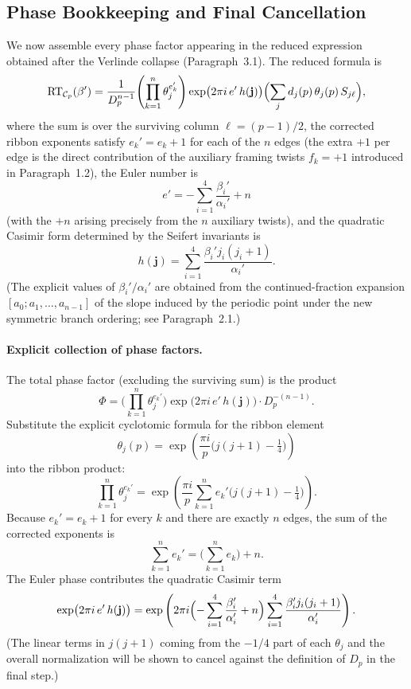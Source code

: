 \subsection{Phase Bookkeeping and Final Cancellation}
\label{subsec:phase-bookkeeping}

We now assemble every phase factor appearing in the reduced expression obtained after the Verlinde collapse (Paragraph~3.1). The reduced formula is
\[
\mathrm{RT}_{\mathcal{C}_p}(\beta') = \frac{1}{D_p^{n-1}} \Biggl( \prod_{k=1}^n \theta_j^{e_k'} \Biggr) \exp\bigl(2\pi i \, e' \, h(\mathbf{j})\bigr) \Bigl( \sum_j d_j(p) \, \theta_j(p) \, S_{j\ell} \Bigr),
\]
where the sum is over the surviving column \(\ell = (p-1)/2\), the corrected ribbon exponents satisfy \(e_k' = e_k + 1\) for each of the \(n\) edges (the extra \(+1\) per edge is the direct contribution of the auxiliary framing twists \(f_k = +1\) introduced in Paragraph~1.2), the Euler number is
\[
e' = -\sum_{i=1}^4 \frac{\beta_i'}{\alpha_i'} + n
\]
(with the \(+n\) arising precisely from the \(n\) auxiliary twists), and the quadratic Casimir form determined by the Seifert invariants is
\[
h(\mathbf{j}) = \sum_{i=1}^4 \frac{\beta_i' j_i(j_i+1)}{\alpha_i'}.
\]
(The explicit values of \(\beta_i'/\alpha_i'\) are obtained from the continued-fraction expansion \([a_0;a_1,\dots,a_{n-1}]\) of the slope induced by the periodic point under the new symmetric branch ordering; see Paragraph~2.1.)

\paragraph{Explicit collection of phase factors.}  
The total phase factor (excluding the surviving sum) is the product
\[
\Phi = \Biggl( \prod_{k=1}^n \theta_j^{e_k'} \Biggr) \exp\bigl(2\pi i \, e' \, h(\mathbf{j})\bigr) \cdot D_p^{-(n-1)}.
\]
Substitute the explicit cyclotomic formula for the ribbon element
\[
\theta_j(p) = \exp\left( \frac{\pi i}{p} \bigl( j(j+1) - \tfrac14 \bigr) \right)
\]
into the ribbon product:
\[
\prod_{k=1}^n \theta_j^{e_k'} = \exp\left( \frac{\pi i}{p} \sum_{k=1}^n e_k' \bigl( j(j+1) - \tfrac14 \bigr) \right).
\]
Because \(e_k' = e_k + 1\) for every \(k\) and there are exactly \(n\) edges, the sum of the corrected exponents is
\[
\sum_{k=1}^n e_k' = \Biggl( \sum_{k=1}^n e_k \Biggr) + n.
\]
The Euler phase contributes the quadratic Casimir term
\[
\exp\bigl(2\pi i \, e' \, h(\mathbf{j})\bigr) = \exp\left( 2\pi i \Bigl( -\sum_{i=1}^4 \frac{\beta_i'}{\alpha_i'} + n \Bigr) \sum_{i=1}^4 \frac{\beta_i' j_i(j_i+1)}{\alpha_i'} \right).
\]
(The linear terms in \(j(j+1)\) coming from the \(-1/4\) part of each \(\theta_j\) and the overall normalization will be shown to cancel against the definition of \(D_p\) in the final step.)

